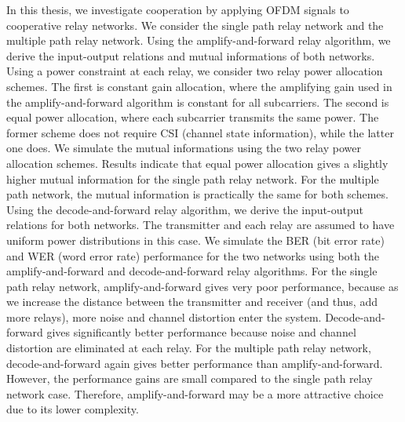 In this thesis, we investigate cooperation by applying OFDM signals to cooperative relay networks.  We consider the single path relay network and the multiple path relay network.  Using the amplify-and-forward relay algorithm, we derive the input-output relations and mutual informations of both networks.  Using a power constraint at each relay, we consider two relay power allocation schemes.  The first is constant gain allocation, where the amplifying gain used in the amplify-and-forward algorithm is constant for all subcarriers.  The second is equal power allocation, where each subcarrier transmits the same power.  The former scheme does not require CSI (channel state information), while the latter one does.  We simulate the mutual informations using the two relay power allocation schemes.  Results indicate that equal power allocation gives a slightly higher mutual information for the single path relay network.  For the multiple path network, the mutual information is practically the same for both schemes.  Using the decode-and-forward relay algorithm, we derive the input-output relations for both networks.  The transmitter and each relay are assumed to have uniform power distributions in this case.  We simulate the BER (bit error rate) and WER (word error rate) performance for the two networks using both the amplify-and-forward and decode-and-forward relay algorithms.  For the single path relay network, amplify-and-forward gives very poor performance, because as we increase the distance between the transmitter and receiver (and thus, add more relays), more noise and channel distortion enter the system.  Decode-and-forward gives significantly better performance because noise and channel distortion are eliminated at each relay.  For the multiple path relay network, decode-and-forward again gives better performance than amplify-and-forward.  However, the performance gains are small compared to the single path relay network case.  Therefore, amplify-and-forward may be a more attractive choice due to its lower complexity.